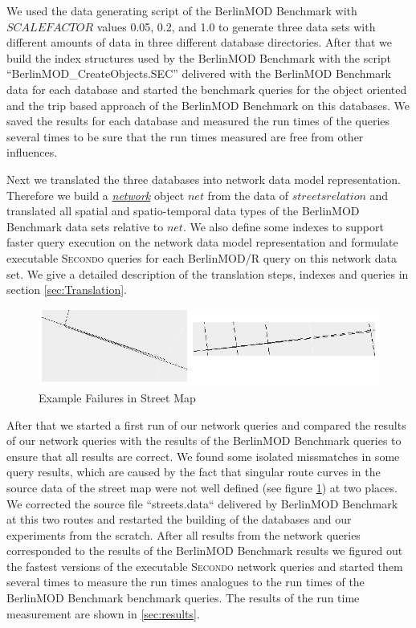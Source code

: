 \documentclass[a4paper]{article}
\newcommand{\secondo}{\textsc{Secondo}}
\newcommand{\bmodb} {BerlinMOD Benchmark}
\newcommand{\dt}[1]{\textsl{\underline{#1}}}
\begin{document}
{We used the data generating script of the \bmodb{} with $SCALEFACTOR$ values
0.05, 0.2, and 1.0 to generate three data sets with different amounts of data in
three different database directories. After that we build the index structures
used by the \bmodb{} with the script ``BerlinMOD\_CreateObjects.SEC'' delivered
with the \bmodb{} data for each database and started the benchmark queries for
the object oriented and the trip based approach of the \bmodb{} on this databases.
 We saved the results for each database and measured the run times of the queries
several times to be sure that the run times measured are free from other influences.

Next we translated the three databases into network data model representation.
Therefore we build a \dt{network} object $net$ from the data of $streets relation$
and  translated all spatial and spatio-temporal data types of the \bmodb{} data
sets relative to $net$. We also define some indexes to support faster query
execution on the network data model representation and formulate executable
\secondo{} queries for each BerlinMOD/R query on this network data set.
We give a detailed description of the translation steps, indexes and queries in
section \ref{sec:Translation}.
\begin{figure}
\begin{center}
	\includegraphics[scale=1.0]{routefailure.eps}
	\caption{Example Failures in Street Map}
	\label{fig:routefailure}
	\end{center}
\end{figure}
After that we started a first run of our network queries and compared the results
of our network queries with the results of the \bmodb{} queries to ensure that all
results are correct. We found some isolated missmatches in some query results,
which are caused by the fact that singular route curves in the source data of
the street map were not well defined (see figure \ref{fig:routefailure}) at two
places. We corrected the source file ``streets.data`` delivered by \bmodb{} at
this two routes and restarted the building of the databases and our experiments
from the scratch. After all results from the network queries corresponded to the
results of the \bmodb{} results we figured out the fastest versions of the
executable \secondo{} network queries and started them several times to measure
the run times analogues to the run times of the \bmodb{} benchmark queries. The
results of the run time measurement are shown in \ref{sec:results}.
}
\end{document}
